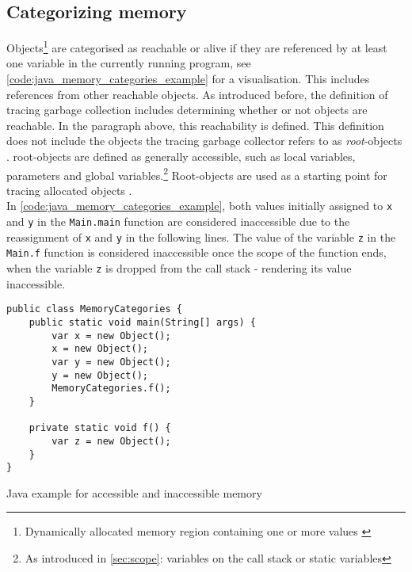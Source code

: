 \subsection{Categorizing memory}
\label{sec:categorizing_memory}

Objects\footnote{Dynamically allocated memory region containing one or more
values \cite[Tracing Garbage Collection]{go_gcguide_2022}} are categorised as
reachable or alive if they are referenced by at least one variable in the
currently running program, see \autoref{code:java_memory_categories_example}
for a visualisation. This includes references from other reachable objects. As
introduced before, the definition of tracing garbage collection includes
determining whether or not objects are reachable. In the paragraph above, this
reachability is defined. This definition does not include the objects the
tracing garbage collector refers to as \textit{root}-objects
\cite[Preliminaries: Heap Depth and Tracing]{tracing-gc_barabash_2010}.
root-objects are defined as generally accessible, such as local variables,
parameters and global variables.\footnote{As introduced in \autoref{sec:scope}:
variables on the call stack or static variables} Root-objects are used as a
starting point for tracing allocated objects \cite[Preliminaries: Heap Depth
and Tracing]{tracing-gc_barabash_2010}.\\

In \autoref{code:java_memory_categories_example}, both values initially
assigned to \texttt{x} and \texttt{y} in the \texttt{Main.main} function are
considered inaccessible due to the reassignment of \texttt{x} and \texttt{y}
in the following lines. The value of the variable \texttt{z} in the
\texttt{Main.f} function is considered inaccessible once the scope of the
function ends, when the variable \texttt{z} is dropped from the call stack -
rendering its value inaccessible. 

\begin{listing}[H] 
    \begin{verbatim} 
public class MemoryCategories {
    public static void main(String[] args) {
        var x = new Object();
        x = new Object();
        var y = new Object();
        y = new Object();
        MemoryCategories.f();
    }

    private static void f() {
        var z = new Object();
    }
}
    \end{verbatim}
    \caption{Java example for accessible and inaccessible memory}
    \label{code:java_memory_categories_example}
\end{listing}



